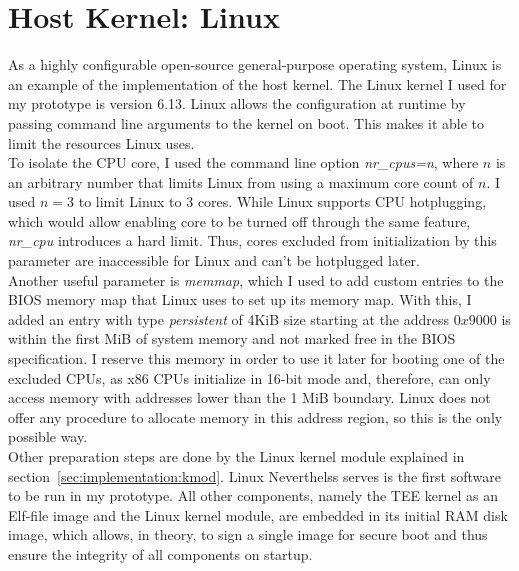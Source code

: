 \section{Host Kernel: Linux}
\label{sec:implementation:hostKernel}

As a highly configurable open-source general-purpose operating system, Linux is
an example of the implementation of the host kernel. The Linux kernel I used for
my prototype is version 6.13. Linux allows the configuration at runtime by
passing command line arguments to the kernel on boot. This makes it able to
limit the resources Linux uses. \\

To isolate the CPU core, I used the command line option \textit{nr\_cpus=n},
where $n$ is an arbitrary number that limits Linux from using a maximum core
count of $n$. I used $n=3$ to limit Linux to 3 cores. While Linux supports CPU
hotplugging, which would allow enabling core to be turned off through
the same feature, \textit{nr\_cpu} introduces a hard limit. Thus, cores excluded
from initialization by this parameter are inaccessible for Linux and can't be
hotplugged later. \\

Another useful parameter is \textit{memmap}, which I used to add custom entries
to the BIOS memory map that Linux uses to set up its memory map. With this, I
added an entry with type \textit{persistent} of 4KiB size starting at the
address $0x9000$ is within the first MiB of system memory and not marked free in
the BIOS specification. I reserve this memory in order to use it
later for booting one of the excluded CPUs, as x86 CPUs initialize in 16-bit
mode and, therefore, can only access memory with addresses lower than the 1 MiB
boundary. Linux does not offer any procedure to allocate memory in this address
region, so this is the only possible way. \\

Other preparation steps are done by the Linux kernel module explained in
section~\ref{sec:implementation:kmod}. Linux Neverthelss serves is the first
software to be run in my prototype. All other components, namely the TEE kernel
as an Elf-file image and the Linux kernel module, are embedded in its initial
RAM disk image, which allows, in theory, to sign a single image for secure boot
and thus ensure the integrity of all components on startup.\\

